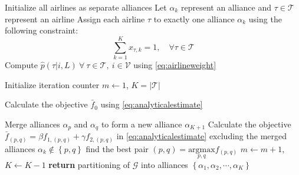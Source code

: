 \documentclass[preprint,times]{elsarticle}
\def\mkhalil#1{{\color{black} #1}}
\begin{document}
\begin{algorithm}[htbp]
\caption{Greedy algorithm for optimal partitioning}
\label{alg:greedy}

\begin{algorithmic}[1]
\State Initialize all \mkhalil{airline}s as separate \mkhalil{alliance}s
\Statex\hspace*{\algorithmicindent}Let $\alpha_k$ represent an \mkhalil{alliance} and $\tau \in \mathcal{T}$ represent an \mkhalil{airline}
\Statex\hspace*{\algorithmicindent}Assign each \mkhalil{airline} $\tau$ to exactly one \mkhalil{alliance} $\alpha_k$ using the following constraint:
\Statex\hspace*{\algorithmicindent}\[
\sum_{k=1}^{K} x_{\tau,k} = 1, \quad \forall \tau \in \mathcal{T}
\]
\Statex\hspace*{\algorithmicindent}Compute $\hat{p}\left(\tau|i,L\right)~\forall~\tau \in \mathcal{T},~i \in \mathcal{V}$ using \eqref{eq:airlineweight}

\State Initialize iteration counter $m \gets 1$, $K = \lvert\mathcal{T}\rvert$

\State Calculate the objective $\bar{f}_0$ using \eqref{eq:analyticalestimate}

\Repeat
{}
\State Merge \mkhalil{alliances} $\alpha_p$ and $\alpha_q$ to form a new \mkhalil{alliance} $\alpha_{K+1}$
\State Calculate the objective $\bar{f}_{(p,q)} = \beta f_{1,(p,q)} + \gamma f_{2,(p,q)}$ in \eqref{eq:analyticalestimate}
\Statex\hspace*{\algorithmicindent}\hspace*{\algorithmicindent}\hspace*{\algorithmicindent}\hspace*{\algorithmicindent}excluding the merged \mkhalil{alliances} $\alpha_k \notin \left\{p,q\right\}$
\EndFor
\EndFor
\Statex\hspace*{\algorithmicindent}\hspace*{\algorithmicindent}find the best pair $(p,q) = \underset{p,q}{\text{argmax}}f_{(p,q)}$
\Statex\hspace*{\algorithmicindent}\hspace*{\algorithmicindent}$m \gets m + 1$, $K \gets K - 1$
\Until{$f_m - f_{m-1} \leq 0$ \textbf{or} $K \mkhalil{=} 1$}
\State \textbf{return} partitioning of $\mathcal{G}$ into \mkhalil{alliances} $\left\{\alpha_1,\alpha_2,\cdots,\alpha_K\right\}$
\EndProcedure
\end{algorithmic}
\end{algorithm}
\end{document}
